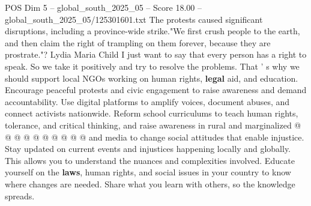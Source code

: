 \begin{textsample}{POS Dim 5 – global\_south\_2025\_05 – Score 18.00 – global\_south\_2025\_05/125301601.txt}
The protests caused significant disruptions, including a province-wide strike."We first crush people to the earth, and then claim the right of trampling on them forever, because they are prostrate."?
Lydia Maria Child I just want to say that every person has a right to speak.
So we take it positively and try to resolve the problems.
That ' s why we should support local NGOs working on human rights, \textbf{legal} aid, and education.
Encourage peaceful protests and civic engagement to raise awareness and demand accountability.
Use digital platforms to amplify voices, document abuses, and connect activists nationwide.
Reform school curriculums to teach human rights, tolerance, and critical thinking, and raise awareness in rural and marginalized @ @ @ @ @ @ @ @ @ @ and media to change social attitudes that enable injustice.
Stay updated on current events and injustices happening locally and globally.
This allows you to understand the nuances and complexities involved.
Educate yourself on the \textbf{laws}, human rights, and social issues in your country to know where changes are needed.
Share what you learn with others, so the knowledge spreads.

\end{textsample}
